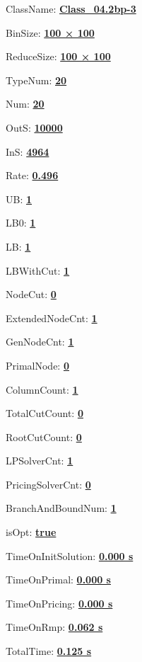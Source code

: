 \documentclass[11pt]{article}
\begin{document}
\pagestyle{empty}


ClassName: \underline{\textbf{Class_04.2bp-3}}
\par
BinSize: \underline{\textbf{100 × 100}}
\par
ReduceSize: \underline{\textbf{100 × 100}}
\par
TypeNum: \underline{\textbf{20}}
\par
Num: \underline{\textbf{20}}
\par
OutS: \underline{\textbf{10000}}
\par
InS: \underline{\textbf{4964}}
\par
Rate: \underline{\textbf{0.496}}
\par
UB: \underline{\textbf{1}}
\par
LB0: \underline{\textbf{1}}
\par
LB: \underline{\textbf{1}}
\par
LBWithCut: \underline{\textbf{1}}
\par
NodeCut: \underline{\textbf{0}}
\par
ExtendedNodeCnt: \underline{\textbf{1}}
\par
GenNodeCnt: \underline{\textbf{1}}
\par
PrimalNode: \underline{\textbf{0}}
\par
ColumnCount: \underline{\textbf{1}}
\par
TotalCutCount: \underline{\textbf{0}}
\par
RootCutCount: \underline{\textbf{0}}
\par
LPSolverCnt: \underline{\textbf{1}}
\par
PricingSolverCnt: \underline{\textbf{0}}
\par
BranchAndBoundNum: \underline{\textbf{1}}
\par
isOpt: \underline{\textbf{true}}
\par
TimeOnInitSolution: \underline{\textbf{0.000 s}}
\par
TimeOnPrimal: \underline{\textbf{0.000 s}}
\par
TimeOnPricing: \underline{\textbf{0.000 s}}
\par
TimeOnRmp: \underline{\textbf{0.062 s}}
\par
TotalTime: \underline{\textbf{0.125 s}}
\par
\newpage
\end{document}
